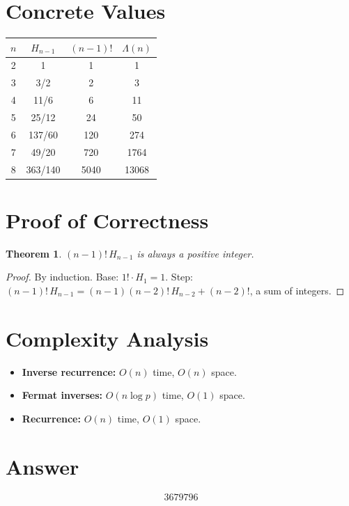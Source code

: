 \documentclass[11pt]{article}
\newtheorem{theorem}{Theorem}
\begin{document}
\section{Concrete Values}

\begin{center}
\begin{tabular}{cccc}
\toprule
$n$ & $H_{n-1}$ & $(n-1)!$ & $\Lambda(n)$ \\
\midrule
2  & 1       & 1      & 1       \\
3  & 3/2     & 2      & 3       \\
4  & 11/6    & 6      & 11      \\
5  & 25/12   & 24     & 50      \\
6  & 137/60  & 120    & 274     \\
7  & 49/20   & 720    & 1764    \\
8  & 363/140 & 5040   & 13068   \\
\bottomrule
\end{tabular}
\end{center}

\section{Proof of Correctness}

\begin{theorem}
$(n-1)!\,H_{n-1}$ is always a positive integer.
\end{theorem}

\begin{proof}
By induction. Base: $1!\cdot H_1 = 1$. Step: $(n-1)!\,H_{n-1} = (n-1)(n-2)!\,H_{n-2} + (n-2)!$, a sum of integers.
\end{proof}

\section{Complexity Analysis}

\begin{itemize}
\item \textbf{Inverse recurrence:} $O(n)$ time, $O(n)$ space.
\item \textbf{Fermat inverses:} $O(n \log p)$ time, $O(1)$ space.
\item \textbf{Recurrence:} $O(n)$ time, $O(1)$ space.
\end{itemize}

\section{Answer}

\[
\boxed{3679796}
\]
\end{document}
